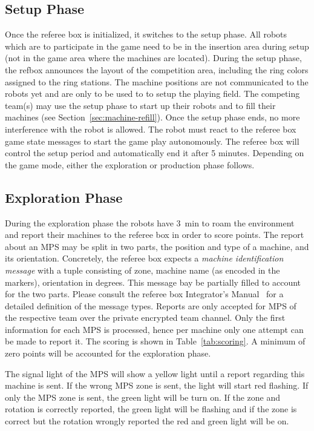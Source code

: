 \documentclass[12pt,twoside]{article}
\newcommand{\refsec}[1]{Section~\ref{#1}}
\newcommand{\reftab}[1]{Table~\ref{#1}}
\begin{document}
\subsection{Setup Phase}
\label{sec:setup-phase}
Once the referee box is initialized, it switches to the setup phase.
All robots which are to
participate in the game need to be in the insertion area during setup
(not in the game area where the machines are located).
During the setup phase, the refbox announces the layout of the competition area,
including the ring colors assigned to the ring stations.
The machine positions are not communicated to the robots yet and are only to
be used to to setup the playing field.
The competing team(s) may use the setup phase to start up their  %
robots and to fill their machines (see \refsec{sec:machine-refill}).
Once the setup phase ends, no more interference with the robot is
allowed. The robot must react to the referee box game state messages
to start the game play autonomously.
The referee box will control the setup period and automatically end it
after 5 minutes.
Depending on the game mode, either the exploration or production phase follows.

\subsection{Exploration Phase}
\label{sec:exploration-phase}
During the exploration phase the robots have \SI{3}{\minute} to roam the
environment and report their machines to the referee box in order to score
points.
The report about an MPS may be split
in two parts, the position and type of a machine, and its orientation.
Concretely, the referee box expects a \emph{machine identification
  message} with a tuple consisting of zone, machine name (as encoded
in the markers), orientation in degrees. This message bay be partially
filled to account for the two parts. Please consult the referee box
Integrator's Manual~\cite{RefBoxIntManual} for a detailed definition
of the message types. Reports are only accepted for MPS of the
respective team over the private encrypted team channel. Only the
first information for each MPS is processed, hence per machine only one attempt
can be made to report it.
The scoring is shown in \reftab{tab:scoring}.
A minimum of zero points will be accounted for the exploration phase.

The signal light of the MPS will show a yellow light until a report regarding
this machine is sent.  If the wrong MPS zone is sent, the light will start red
flashing.  If only the MPS zone is sent, the green light will be turn on.  If
the zone and rotation is correctly reported, the green light will be flashing
and if the zone is correct but the rotation wrongly reported the red and green
light will be on.
\end{document}
